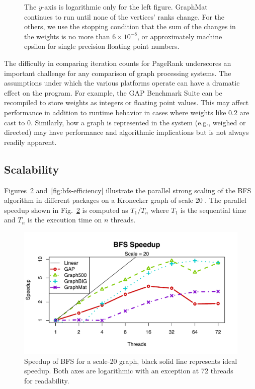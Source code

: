 \documentclass[conference]{IEEEtran}
\begin{document}
\begin{figure}
\begin{minipage}{0.48\linewidth}
	\end{minipage}
	\caption{The $y$-axis is logarithmic only for the left figure. GraphMat continues to run until none of the vertices' ranks change. For the others, we use the stopping condition that the sum of the changes in the weights is no more than $6 \times 10^{-8}$, or approximately machine epsilon for single precision floating point numbers.}
	\label{fig:pr}
\end{figure}


The difficulty in comparing iteration counts for PageRank underscores an important challenge for any comparison of graph processing systems. The assumptions under which the various platforms operate can have a dramatic effect on the program. For example, the GAP Benchmark Suite can be recompiled to store weights as integers or floating point values. This may affect performance in addition to runtime behavior in cases where weights like $0.2$ are cast to $0$. Similarly, how a graph is represented in the system (e.g., weighed or directed) may have performance and algorithmic implications but is not always readily apparent.

\subsection{Scalability}
Figures~\ref{fig:bfs-speedup} and~\ref{fig:bfs-efficiency} illustrate the parallel strong scaling of the BFS algorithm in different packages on a Kronecker graph of scale $20$ . The parallel speedup shown in Fig.~\ref{fig:bfs-speedup} is computed as $T_1 / T_n$ where $T_1$ is the sequential time and $T_n$ is the execution time on $n$ threads. 
\begin{figure}[htb]
	\centering
		\includegraphics[width=\linewidth, trim=0 18pt 18pt 12pt, clip]{graphics/bfs_speedup20.pdf}
		\caption{Speedup of BFS for a scale-20 graph, black solid line represents ideal speedup. Both axes are logarithmic with an exception at 72 threads for readability. }
	\label{fig:bfs-speedup}
\end{figure}
\end{document}
